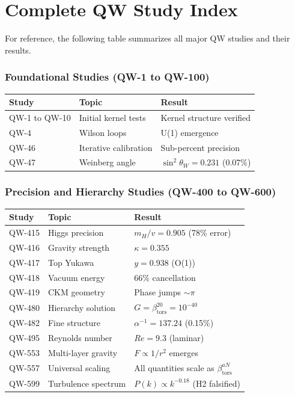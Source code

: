 \documentclass[11pt, a4paper]{article}
\theoremstyle{remark}
\newcommand{\betators}{\beta_{\text{tors}}}
\begin{document}
\part{Complete QW Study Index}

For reference, the following table summarizes all major QW studies and their results.

\section{Foundational Studies (QW-1 to QW-100)}

\begin{center}
\begin{longtable}{|l|l|l|}
\hline
\textbf{Study} & \textbf{Topic} & \textbf{Result} \\
\hline
QW-1 to QW-10 & Initial kernel tests & Kernel structure verified \\
QW-4 & Wilson loops & U(1) emergence \\
QW-46 & Iterative calibration & Sub-percent precision \\
QW-47 & Weinberg angle & $\sin^2\theta_W = 0.231$ (0.07\%) \\
\hline
\end{longtable}
\end{center}

\section{Precision and Hierarchy Studies (QW-400 to QW-600)}

\begin{center}
\begin{longtable}{|l|l|l|}
\hline
\textbf{Study} & \textbf{Topic} & \textbf{Result} \\
\hline
QW-415 & Higgs precision & $m_H/v = 0.905$ (78\% error) \\
QW-416 & Gravity strength & $\kappa = 0.355$ \\
QW-417 & Top Yukawa & $y = 0.938$ (O(1)) \\
QW-418 & Vacuum energy & 66\% cancellation \\
QW-419 & CKM geometry & Phase jumps $\sim \pi$ \\
QW-480 & Hierarchy solution & $G = \betators^{20} = 10^{-40}$ \\
QW-482 & Fine structure & $\alpha^{-1} = 137.24$ (0.15\%) \\
QW-495 & Reynolds number & $Re = 9.3$ (laminar) \\
QW-553 & Multi-layer gravity & $F \propto 1/r^2$ emerges \\
QW-557 & Universal scaling & All quantities scale as $\betators^{aN}$ \\
QW-599 & Turbulence spectrum & $P(k) \propto k^{-0.18}$ (H2 falsified) \\
\hline
\end{longtable}
\end{center}
\end{document}

